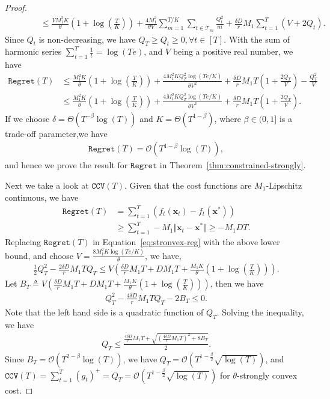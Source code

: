\documentclass[twoside,11pt,]{article}
\newcommand{\C}[1]{\mathcal{#1}}
\newcommand{\BF}[1]{\mathbf{#1}}
\newcommand{\x}{\BF{x}}
\newcommand{\xt}{\x_t}
\newcommand{\xs}{\x^*}
\newcommand{\sumT}{\sum\limits_{t=1}^T}
\newcommand{\qt}{Q_t}
\begin{document}
\begin{proof}
\begin{align*}
        & \quad \quad \quad \leq \frac{VM_1^2K}{\theta}(1+\log(\frac{T}{K})) 
        +\frac{4M_1^2}{\theta V } \sum_{m=1}^{T/K}\sum_{t\in\C{T}_m} \frac{\qt^2}{m} 
        + \frac{\delta D}{r} M_1 \sumT (V+2\qt).
    \end{align*}
    Since $Q_t$ is non-decreasing, we have $Q_T \geq Q_t \geq 0, \forall t\in[T]$. With the sum of harmonic series $\sumT \frac{1}{t} = \log(Te)$, and $V$ being a positive real number, we have
    \begin{align}
    \label{eq:stronvex-reg}
        \mathtt{Regret}(T) &\leq \frac{M_1^2K}{\theta}(1+\log(\frac{T}{K})) 
        +\frac{4M_1^2KQ_T^2 \log(Te/K)}{\theta V^2} + \frac{\delta D}{r} M_1 T (1+\frac{2Q_T}{V}) - \frac{Q_T^2}{V} \\
        & \leq \frac{M_1^2K}{\theta}(1+\log(\frac{T}{K})) 
        +\frac{4M_1^2KQ_T^2 \log(Te/K)}{\theta V^2} + \frac{\delta D}{r} M_1 T (1+\frac{2Q_T}{V}). \nonumber
    \end{align}
    If we choose $\delta=\Theta(T^{-\beta} \log(T))$ and $K=\Theta(T^{1-\beta})$, where $\beta \in (0,1]$ is a trade-off parameter,we have 
    \begin{align*}
       \mathtt{Regret}(T) = \C{O}(T^{1-\beta}\log(T)),
    \end{align*}
    and hence we prove the result for $\mathtt{Regret}$ in Theorem~\ref{thm:constrained-strongly}.
    
    Next we take a look at $\mathtt{CCV}(T)$. Given that the cost functions are $M_1$-Lipschitz continuous, we have 
    \begin{align*}
        \mathtt{Regret}(T)&=\sumT(f_t(\xt)-f_t(\xs))\\
        &\geq \sumT-M_1\Vert \x_t - \xs \Vert \geq -M_1DT.
    \end{align*}
    Replacing $\mathtt{Regret}(T)$ in Equation~\eqref{eq:stronvex-reg} with the above lower bound, and choose $V=\frac{8M_1^2K\log(Te/K)}{\theta}$, we have,
    \begin{align*}
        \frac{1}{2}Q_T^2-\frac{2\delta D}{r}M_1 T Q_T \leq V(\frac{\delta D}{r} M_1 T + D M_1 T + \frac{M_1K}{\theta}(1+\log(\frac{T}{K}))).
    \end{align*}
    Let $B_T\triangleq V(\frac{\delta D}{r} M_1 T + D M_1 T + \frac{M_1K}{\theta}(1+\log(\frac{T}{K})))$, then we have 
    \begin{align*}
        Q_T^2- \frac{4\delta D}{r} M_1 T Q_T - 2B_T \leq 0.
    \end{align*}
    Note that the left hand side is a quadratic function of $Q_T$.  Solving the inequality, we have
    \begin{align*}
        Q_T \leq \frac{\frac{4\delta D}{r} M_1 T + \sqrt{(\frac{4\delta D}{r} M_1 T)^2 + 8B_T}}{2}.
    \end{align*}
    Since $B_T = \C{O}(T^{2-\beta}\log(T))$, we have $Q_T = \C{O}(T^{1-\frac{\beta}{2}}\sqrt{\log(T)})$, and $\mathtt{CCV}(T)= \sumT (g_t)^+ = Q_T = \C{O}(T^{1-\frac{\beta}{2}}\sqrt{\log(T)})$ for $\theta$-strongly convex cost. 


\end{proof}
\end{document}
